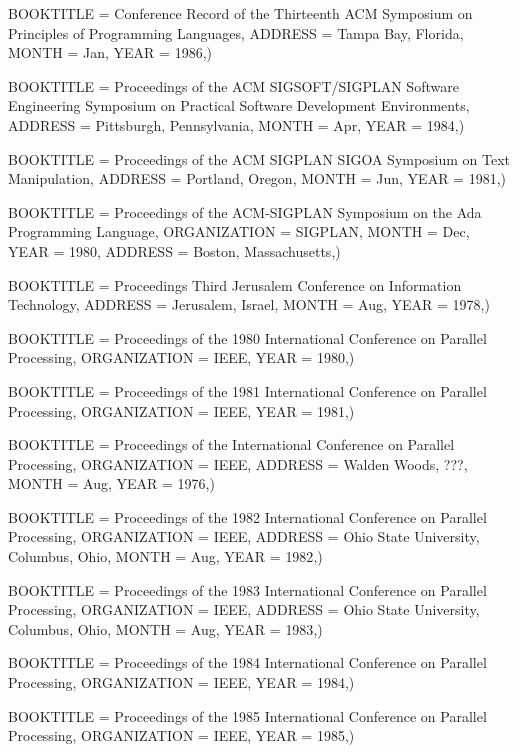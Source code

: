     BOOKTITLE = {Conference Record of the Thirteenth ACM Symposium on Principles of Programming Languages},
    ADDRESS = {Tampa Bay, Florida},
    MONTH = Jan,
    YEAR = {1986},)


    BOOKTITLE = {Proceedings of the ACM SIGSOFT/SIGPLAN Software Engineering Symposium on Practical Software Development Environments},
    ADDRESS = {Pittsburgh, Pennsylvania},
    MONTH = Apr,
    YEAR = {1984},)
    
    BOOKTITLE = {Proceedings of the ACM SIGPLAN SIGOA Symposium on Text Manipulation},
    ADDRESS = {Portland, Oregon},
    MONTH = Jun,
    YEAR = {1981},)
    
    BOOKTITLE = {Proceedings of the ACM-SIGPLAN Symposium on the Ada Programming Language},
    ORGANIZATION = {SIGPLAN},
    MONTH = Dec,
    YEAR = {1980},
    ADDRESS = {Boston, Massachusetts},)
    
    BOOKTITLE = {Proceedings Third Jerusalem Conference on Information Technology},
    ADDRESS = {Jerusalem, Israel},
    MONTH = Aug,
    YEAR = {1978},)

    BOOKTITLE = {Proceedings of the 1980 International Conference on 
		 Parallel Processing},
    ORGANIZATION = {IEEE},
    YEAR = {1980},)

    BOOKTITLE = {Proceedings of the 1981 International Conference on 
		 Parallel Processing},
    ORGANIZATION = {IEEE},
    YEAR = {1981},)

    BOOKTITLE = {Proceedings of the International Conference on 
		 Parallel Processing},
    ORGANIZATION = {IEEE},
    ADDRESS = {Walden Woods, ???},
    MONTH = Aug,
    YEAR = {1976},)

    BOOKTITLE = {Proceedings of the 1982 International Conference on 
		 Parallel Processing},
    ORGANIZATION = {IEEE},
    ADDRESS = {Ohio State University, Columbus, Ohio},
    MONTH = Aug,
    YEAR = {1982},)

    BOOKTITLE = {Proceedings of the 1983 International Conference on 
		 Parallel Processing},
    ORGANIZATION = {IEEE},
    ADDRESS = {Ohio State University, Columbus, Ohio},
    MONTH = Aug,
    YEAR = {1983},)

    BOOKTITLE = {Proceedings of the 1984 International Conference on 
		 Parallel Processing},
    ORGANIZATION = {IEEE},
    YEAR = {1984},)

    BOOKTITLE = {Proceedings of the 1985 International Conference on 
		 Parallel Processing},
    ORGANIZATION = {IEEE},
    YEAR = {1985},)

